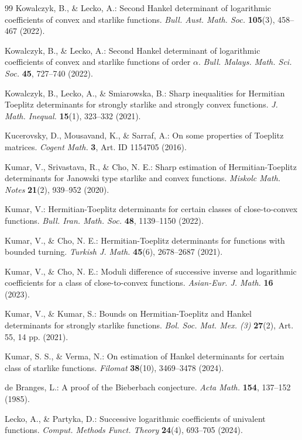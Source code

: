 \documentclass[11pt]{article}
\numberwithin{equation}{section}
\begin{document}
\begin{thebibliography}{99}
 Kowalczyk, B., \& Lecko, A.: Second Hankel determinant of logarithmic coefficients of convex and starlike functions. \emph{Bull. Aust. Math. Soc.} \textbf{105}(3), 458--467 (2022).

 Kowalczyk, B., \& Lecko, A.: Second Hankel determinant of logarithmic coefficients of convex and starlike functions of order $\alpha$. \emph{Bull. Malays. Math. Sci. Soc.} \textbf{45}, 727--740 (2022).

 Kowalczyk, B., Lecko, A., \& Smiarowska, B.: Sharp inequalities for Hermitian Toeplitz determinants for strongly starlike and strongly convex functions. \emph{J. Math. Inequal.} \textbf{15}(1), 323--332 (2021).

 Kucerovsky, D., Mousavand, K., \& Sarraf, A.: On some properties of Toeplitz matrices. \emph{Cogent Math.} \textbf{3}, Art. ID 1154705 (2016).

 Kumar, V., Srivastava, R., \& Cho, N. E.: Sharp estimation of Hermitian-Toeplitz determinants for Janowski type starlike and convex functions. \emph{Miskolc Math. Notes} \textbf{21}(2), 939--952 (2020).

 Kumar, V.: Hermitian-Toeplitz determinants for certain classes of close-to-convex functions. \emph{Bull. Iran. Math. Soc.} \textbf{48}, 1139--1150 (2022).

 Kumar, V., \& Cho, N. E.: Hermitian-Toeplitz determinants for functions with bounded turning. \emph{Turkish J. Math.} \textbf{45}(6), 2678--2687 (2021).

 Kumar, V., \& Cho, N. E.: Moduli difference of successive inverse and logarithmic coefficients for a class of close-to-convex functions. \emph{Asian-Eur. J. Math.} \textbf{16} (2023).

 Kumar, V., \& Kumar, S.: Bounds on Hermitian-Toeplitz and Hankel determinants for strongly starlike functions. \emph{Bol. Soc. Mat. Mex. (3)} \textbf{27}(2), Art. 55, 14 pp. (2021).

 Kumar, S. S., \& Verma, N.: On estimation of Hankel determinants for certain class of starlike functions. \emph{Filomat} \textbf{38}(10), 3469--3478 (2024).

 de Branges, L.: A proof of the Bieberbach conjecture. \emph{Acta Math.} \textbf{154}, 137--152 (1985).

 Lecko, A., \& Partyka, D.: Successive logarithmic coefficients of univalent functions. \emph{Comput. Methods Funct. Theory} \textbf{24}(4), 693--705 (2024).


\end{thebibliography}
\end{document}
